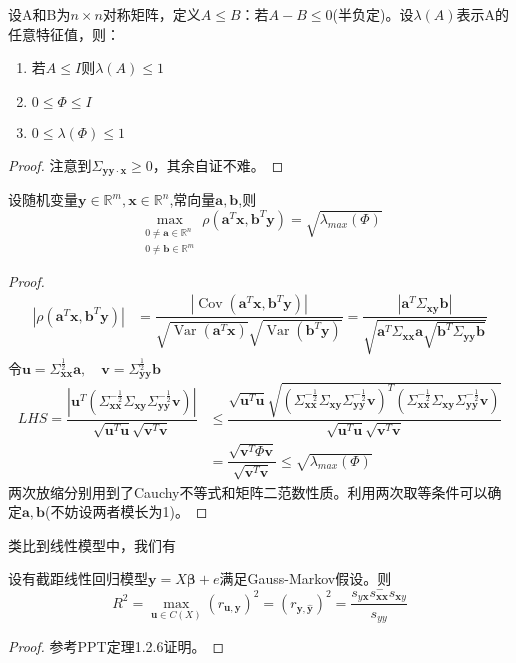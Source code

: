 \documentclass[cn,hazy,green,12pt,normal]{elegantnote}
\DeclareMathOperator{\Cov}{Cov}
\DeclareMathOperator{\Var}{Var}
\newcommand{\MR}{\mathbb R}
\numberwithin{equation}{section}
\numberwithin{subsection}{section}
\begin{document}
\begin{theorem}
    设A和B为$n\times n$对称矩阵，定义$A\leq B：$若$A-B\leq 0$(半负定)。设$\lambda(A)$表示A的任意特征值，则：

    \begin{enumerate}
        \item 若$A\leq I$则$\lambda(A)\leq 1$
        \item $0\leq \Phi \leq I$
        \item $0\leq \lambda(\Phi)\leq 1$
    \end{enumerate}
\end{theorem}

\begin{proof}
   注意到$\Sigma_{\bm y\bm y \cdot \bm x}\geq 0$，其余自证不难。
\end{proof}

\begin{theorem}\label{relation}
    设随机变量$\bm y \in \MR^m,\bm x \in \MR^n$,常向量$\bm a,\bm b$,则
    \[
    \max_{\substack{0\neq \bm a \in \MR^n\\0\neq \bm b \in \MR^m}} \rho(\bm a^T \bm x,\bm b^T \bm y)=\sqrt{\lambda_{max}(\Phi)}
    \]
\end{theorem}

\begin{proof}
\begin{align*}
        |\rho(\bm a^T \bm x,\bm b^T \bm y)|&=\dfrac{|\Cov(\bm a^T \bm x,\bm b^T \bm y)|}{\sqrt{\Var(\bm a^T \bm x)}\sqrt{\Var(\bm b^T \bm y)}}=\dfrac{|\bm a^T\Sigma_{\bm x \bm y}\bm b|}{\sqrt{\bm a^T \Sigma_{\bm x \bm x}\bm a \sqrt{\bm b^T \Sigma_{\bm y\bm y}\bm b}}}
\end{align*}
令$\bm u = \Sigma_{\bm x \bm x}^{\frac{1}{2}}\bm a,\quad \bm v = \Sigma_{\bm y \bm y}^{\frac{1}{2}}\bm b$
\begin{align*}
    LHS = \dfrac{|\bm u ^T(\Sigma_{\bm x\bm x}^{-\frac{1}{2}}\Sigma_{\bm x\bm y}\Sigma_{\bm y\bm y}^{-\frac{1}{2}}\bm v)|}{\sqrt{\bm u^T\bm u}\sqrt{\bm v^T\bm v}}&\leq  \dfrac{\sqrt{\bm u^T\bm u}\sqrt{(\Sigma_{\bm x\bm x}^{-\frac{1}{2}}\Sigma_{\bm x\bm y}\Sigma_{\bm y\bm y}^{-\frac{1}{2}}\bm v)^T(\Sigma_{\bm x\bm x}^{-\frac{1}{2}}\Sigma_{\bm x\bm y}\Sigma_{\bm y\bm y}^{-\frac{1}{2}}\bm v)}}{\sqrt{\bm u^T\bm u}\sqrt{\bm v^T\bm v}}\\
    &=\dfrac{\sqrt{\bm v^T \Phi \bm v}}{\sqrt{\bm v^T\bm v}}\leq \sqrt{\lambda_{max}(\Phi)}
\end{align*}
两次放缩分别用到了Cauchy不等式和矩阵二范数性质。利用两次取等条件可以确定$\bm a,\bm b$(不妨设两者模长为1)。
\end{proof}

类比到线性模型中，我们有
\begin{theorem}设有截距线性回归模型$\bm y=X\bm \beta +e$满足Gauss-Markov假设。则
    \[R^2=\max_{\bm u \in C(X)}(r_{\bm u,\bm y})^2=(r_{\bm y,\hat{\bm y}})^2=\dfrac{s_{y\bm x}s_{\bm x\bm x}^{-}s_{\bm x y}}{s_{yy}}\]
\end{theorem}
\begin{proof}
    参考PPT定理1.2.6证明。
\end{proof}
\end{document}
